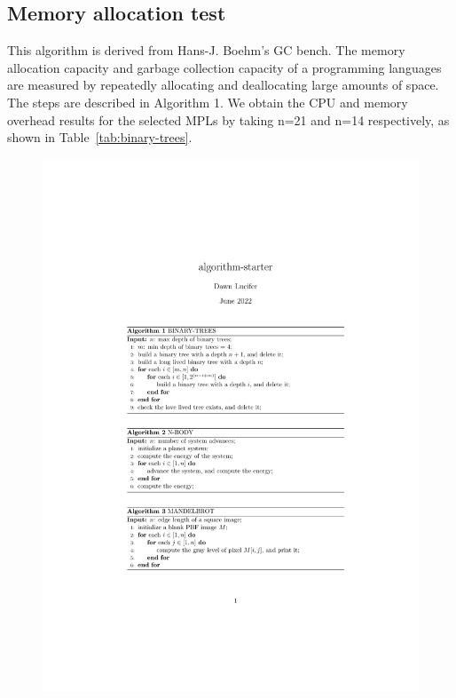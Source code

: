 \subsection{Memory allocation test}
This algorithm is derived from Hans-J. Boehm's GC bench.
The memory allocation capacity and garbage collection capacity of a programming languages
are measured by repeatedly allocating and deallocating large amounts of space.
The steps are described in Algorithm 1.
We obtain the CPU and memory overhead results for the selected MPLs
by taking n=21 and n=14 respectively, as shown in Table~\ref{tab:binary-trees}.

\begin{figure}[htbp]
    \centerline{\includegraphics[scale=0.8]{figures/binary-trees}}
    \label{fig:binary-trees}
\end{figure}


